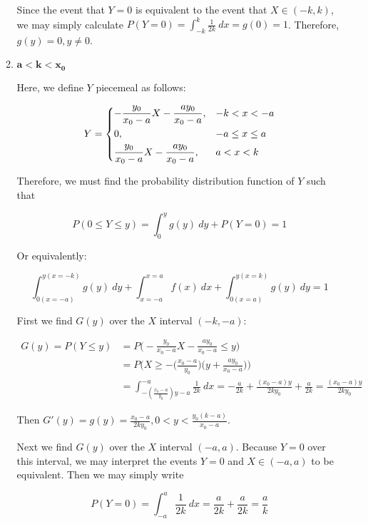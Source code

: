 \documentclass[10pt, oneside]{article}   	%
\theoremstyle{definition}
\begin{document}
\begin{enumerate}[label=5.\arabic*]
\begin{enumerate}
	Since the event that $Y = 0$ is equivalent to the event that $X \in (-k, k)$, we may simply calculate $P(Y = 0) = \int^k_{-k} \frac{1}{2k} \ dx = \boxed{g(0) = 1}$. Therefore, $\boxed{g(y) = 0}, y \neq 0$.
	
	\item  \begin{tcolorbox}[
	  colback=Cerulean!5!white,
	  colframe=Cerulean!75!black]
	\textbf{$\bm{a < k < x_0}$}
	\end{tcolorbox}
	
	Here, we define $Y$ piecemeal as follows:
	
	\[ Y = \begin{dcases}
	-\frac{y_0}{x_0 - a} X - \frac{ay_0}{x_0 - a}, & -k < x < -a \\
	0, &-a \leq x \leq a \\
	\frac{y_0}{x_0 - a} X - \frac{ay_0}{x_0 - a}, &a < x < k
	\end{dcases} \]
	
	Therefore, we must find the probability distribution function of $Y$ such that
	
	\[ P(0 \leq Y \leq y) =  \int^y_0 g(y) \ dy + P(Y = 0) = 1 \]
	
	Or equivalently:
	
	\[ \int^{y (x = -k)}_{0 (x = -a)} g(y) \ dy + \int^{x = a}_{x = -a} f(x) \ dx + \int^{y (x = k)}_{0 (x = a)} g(y) \ dy = 1 \]
	
	First we find $G(y)$ over the $X$ interval $(-k, -a)$:
	
	\begin{align*}
	G(y) = P(Y \leq y) &= P\Big( -\frac{y_0}{x_0 - a} X - \frac{ay_0}{x_0 - a} \leq y \Big) \\
	&= P \Big( X \geq - \Big( \frac{x_0 - a}{y_0} \Big) \Big( y + \frac{ay_0}{x_0 - a} \Big) \Big) \\
	&= \int^{-a}_{-(\frac{x_0 - a}{y_0}) y - a} \frac{1}{2k} \ dx = -\frac{a}{2k} + \frac{(x_0 - a)y}{2ky_0} + \frac{a}{2k} = \frac{(x_0 - a)y}{2ky_0}
	\end{align*}
	
	Then $G'(y) = g(y) = \boxed{\frac{x_0 - a}{2ky_0}, 0 < y < \frac{y_0 (k - a)}{x_0 - a}}$.
	
	Next we find $G(y)$ over the $X$ interval $(-a, a)$. Because $Y = 0$ over this interval, we may interpret the events $Y = 0$ and $X \in (-a,a)$ to be equivalent. Then we may simply write
	
	\[ P(Y = 0) = \int^a_{-a} \frac{1}{2k} \ dx = \frac{a}{2k} + \frac{a}{2k} = \boxed{\frac{a}{k}} \]
	

\end{enumerate}
\end{enumerate}
\end{document}
